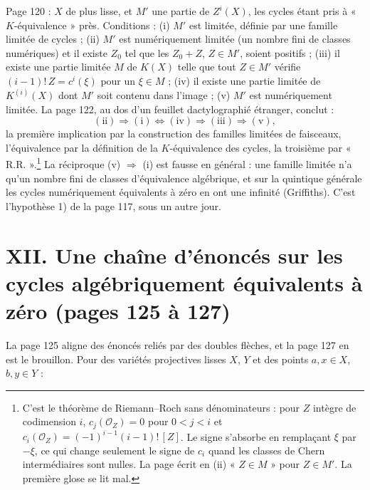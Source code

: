 \documentclass[11pt,a4paper]{article}
\begin{document}
Page 120 : $X$ de plus lisse, et $M'$ une partie de $Z^{i}(X)$, les cycles étant
pris à « $K$-équivalence » près. Conditions : (i) $M'$ est limitée, définie par
une famille limitée de cycles ; (ii) $M'$ est numériquement limitée (un nombre
fini de classes numériques) et il existe $Z_{0}$ tel que les $Z_{0} + Z$, $Z
\in M'$, soient positifs ; (iii) il existe une partie limitée $M$ de $K(X)$ telle
que tout $Z \in M'$ vérifie $(i-1)!\,Z = c^{i}(\xi)$ pour un $\xi \in M$ ; (iv) il
existe une partie limitée de $K^{(i)}(X)$ dont $M'$ soit contenu dans l'image ;
(v) $M'$ est numériquement limitée. La page 122, au dos d'un feuillet
dactylographié étranger, conclut :
\[
(\mathrm{ii}) \Longrightarrow (\mathrm{i}) \Longleftrightarrow (\mathrm{iv})
\Longrightarrow (\mathrm{iii}) \Longrightarrow (\mathrm{v}) ,
\]
la première implication par la construction des familles limitées de
faisceaux, l'équivalence par la définition de la $K$-équivalence des cycles, la
troisième par « R.R. ».\footnote{C'est le théorème de Riemann--Roch sans
dénominateurs : pour $Z$ intègre de codimension $i$, $c_{j}(\mathcal{O}_{Z}) = 0$
pour $0 < j < i$ et $c_{i}(\mathcal{O}_{Z}) = (-1)^{i-1}(i-1)!\,[Z]$. Le signe
s'absorbe en remplaçant $\xi$ par $-\xi$, ce qui change seulement le signe de
$c_{i}$ quand les classes de Chern intermédiaires sont nulles. La page écrit en
(ii) « $Z \in M$ » pour $Z \in M'$. La première glose se lit mal.} La réciproque
(v) $\Rightarrow$ (i) est fausse en général : une famille limitée n'a qu'un
nombre fini de classes d'équivalence algébrique, et sur la quintique générale
les cycles numériquement équivalents à zéro en ont une infinité (Griffiths). C'est
l'hypothèse 1) de la page 117, sous un autre jour.

\section*{XII. Une chaîne d'énoncés sur les cycles algébriquement équivalents à
zéro (pages 125 à 127)}

La page 125 aligne des énoncés reliés par des doubles flèches, et la page 127
en est le brouillon. Pour des variétés projectives lisses $X$, $Y$ et des points
$a, x \in X$, $b, y \in Y$ :
\end{document}
